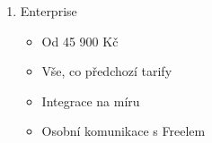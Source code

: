 \begin{enumerate}
\begin{itemize}
\begin{itemize}
	      	      	\item Do 15 uživatelů: 3 590 Kč
	      	      	\item Do 20 uživatelů: 4 180 Kč
	      	      	\item Nad 20 uživatelů: 4 180 Kč + 209 Kč za 21. uživatele a dál\footnote{Za každou započatou 20 uživatelů se sníží celkový poplatek za každého uživatele o 16 Kč až do 160 Kč za uživatele}
	      	      \end{itemize}
	      	\item Vše, co předchozí tarify
	      	\item Vlastní role
	      	\item Rozšíření vazeb
	      	\item Přehledy
	      	\item Rozšířené zabezpečení
	      	\item Genttův diagram
	      \end{itemize}
	\item Enterprise
	      \begin{itemize}
	      	\item Od 45 900 Kč
	      	\item Vše, co předchozí tarify
	      	\item Integrace na míru
	      	\item Osobní komunikace s Freelem
	      \end{itemize}
\end{enumerate}